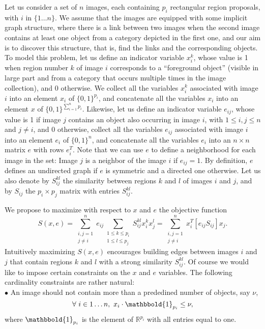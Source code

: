 \documentclass[10pt,twocolumn,letterpaper]{article}
\numberwithin{theorem}{section}
\newcommand{\RR}{\mathbb{R}}
\begin{document}
Let us consider a set of $n$ images, each containing $p_i$ rectangular
region proposals, with $i$ in $\{1\dots n\}$.  We assume that the images are
equipped with some implicit graph structure, where there is a link
between two images when the second image contains at least one object from a category depicted in the first one,
and our aim is to discover this structure, that is, find the links and the
corresponding objects.  To model this problem, let us define an
indicator variable $x_i^k$, whose value is 1 when region number $k$ of
image $i$ corresponds to a ``foreground object'' (visible in large part and from a category that occurs multiple times in the image collection), and 0 otherwise. We
collect all the variables $x_i^k$ associated with image $i$ into an
element $x_i$ of $\{0,1\}^{p_i}$, and concatenate all the variables
$x_i$ into an element $x$ of $\{0,1\}^{\sum_{i=1}^np_i}$. Likewise,
let us define an indicator variable $e_{ij}$, whose value is 1 if
image $j$ contains an object also occurring in image $i$, with $1\le
i,j\le n$ and $j\neq i$, and 0 otherwise,
collect all the variables $e_{ij}$ associated with image $i$ into an
element $e_i$ of $\{0,1\}^n$, and concatenate all the variables $e_i$
into an $n\times n$ matrix $e$ with rows $e_i^T$. Note that we can use
$e$ to define a neighborhood for each image in the set: Image $j$ is a
neighbor of the image $i$ if $e_{ij} = 1$. By definition, $e$ defines
an undirected graph if $e$ is symmetric and a directed one
otherwise. Let us also denote by $S_{ij}^{kl}$ the similarity between
regions $k$ and $l$ of images $i$ and $j$, and by $S_{ij}$ the
$p_i\times p_j$ matrix with entries $S_{ij}^{kl}$.

We propose to maximize with respect to $x$ and $e$ the objective
function
\begin{equation}
S(x,e)=\!\!\sum_{\substack{i,j=1\\j\neq i}}^n \!e_{ij}\! 
\!\sum_{\substack{1\le k\le p_i\\ 1\le l\le p_j}}\!\!\!S_{ij}^{kl} x_i^kx_j^l 
=\!\sum_{\substack{i,j=1\\j\neq i}}^n \!x_i^T [e_{ij}S_{ij}] x_j.\label{eq:main}
\end{equation}
Intuitively maximizing $S(x,e)$ encourages building edges between
images $i$ and $j$ that contain regions $k$ and $l$ with a strong
similarity $S_{ij}^{kl}$.  Of course we would like to impose certain
constraints on the $x$ and $e$ variables. The following cardinality
constraints are rather natural:\\
\noindent$\bullet$ An image should not contain more than a prededined
number of objects, say $\nu$,
\begin{equation}
\forall\,\, i\in 1\ldots n,\,\, x_i\cdot\mathbbold{1}_{p_i}\le \nu,
\label{eq:aux1}
\end{equation}
where $\mathbbold{1}_{p_i}$ is the element of $\RR^{p_i}$ with all
entries equal to one.
\end{document}
